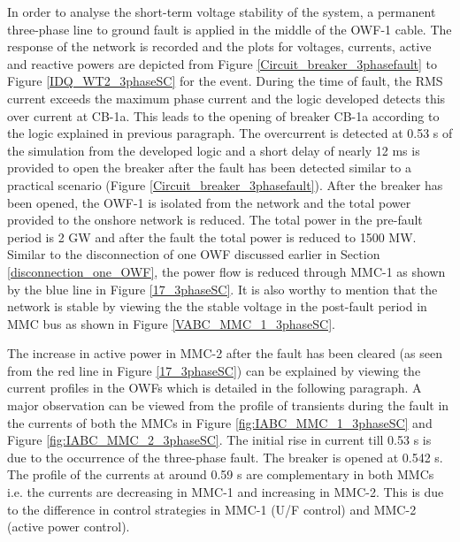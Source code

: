 In order to analyse the short-term voltage stability of the system, a permanent three-phase line to ground fault is applied in the middle of the \gls{OWF}-1 cable. The response of the network is recorded and the plots for voltages, currents, active and reactive powers are depicted from Figure \ref{Circuit_breaker_3phasefault} to Figure \ref{IDQ_WT2_3phaseSC} for the event. During the time of fault, the RMS current exceeds the maximum phase current and the logic developed detects this over current at CB-1a. This leads to the opening of breaker CB-1a according to the logic explained in previous paragraph. The overcurrent is detected at 0.53 s of the simulation from the developed logic and a short delay of nearly 12 ms is provided to open the breaker after the fault has been detected similar to a practical scenario (Figure \ref{Circuit_breaker_3phasefault}). After the breaker has been opened, the \gls{OWF}-1 is isolated from the network and the total power provided to the onshore network is reduced. The total power in the pre-fault period is 2 GW and after the fault the total power is reduced to 1500 MW. Similar to the disconnection of one \gls{OWF} discussed earlier in Section \ref{disconnection_one_OWF}, the power flow is reduced through \gls{MMC}-1 as shown by the blue line in Figure \ref{17_3phaseSC}. It is also worthy to mention that the network is stable by viewing the the stable voltage in the post-fault period in \gls{MMC} bus as shown in Figure \ref{VABC_MMC_1_3phaseSC}.



The increase in active power in \gls{MMC}-2 after the fault has been cleared (as seen from the red line in Figure \ref{17_3phaseSC}) can be explained by viewing the current profiles in the \gls{OWF}s which is detailed in the following paragraph. A major observation can be viewed from the profile of transients during the fault in the currents of both the \gls{MMC}s in Figure \ref{fig:IABC_MMC_1_3phaseSC} and Figure \ref{fig:IABC_MMC_2_3phaseSC}. The initial rise in current till 0.53 s is due to the occurrence of the three-phase fault. The breaker is opened at 0.542 s. The profile of the currents at around 0.59 s are complementary in both \gls{MMC}s i.e. the currents are decreasing in \gls{MMC}-1 and increasing in \gls{MMC}-2. This is due to the difference in control strategies in \gls{MMC}-1 (U/F control) and \gls{MMC}-2 (active power control).

